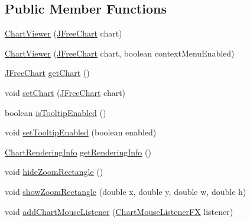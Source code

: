 \subsection*{Public Member Functions}
\begin{DoxyCompactItemize}
\item 
\mbox{\hyperlink{classorg_1_1jfree_1_1chart_1_1fx_1_1_chart_viewer_a4bccc9c8c5c2aafaae0150cbc6277b2d}{Chart\+Viewer}} (\mbox{\hyperlink{classorg_1_1jfree_1_1chart_1_1_j_free_chart}{J\+Free\+Chart}} chart)
\item 
\mbox{\hyperlink{classorg_1_1jfree_1_1chart_1_1fx_1_1_chart_viewer_a7c8707565c8c0eef578822e811200d25}{Chart\+Viewer}} (\mbox{\hyperlink{classorg_1_1jfree_1_1chart_1_1_j_free_chart}{J\+Free\+Chart}} chart, boolean context\+Menu\+Enabled)
\item 
\mbox{\hyperlink{classorg_1_1jfree_1_1chart_1_1_j_free_chart}{J\+Free\+Chart}} \mbox{\hyperlink{classorg_1_1jfree_1_1chart_1_1fx_1_1_chart_viewer_a1a140802ca5d675540bc2c71e39e2951}{get\+Chart}} ()
\item 
void \mbox{\hyperlink{classorg_1_1jfree_1_1chart_1_1fx_1_1_chart_viewer_ae4f3627a0cbf9f989301265d869c445f}{set\+Chart}} (\mbox{\hyperlink{classorg_1_1jfree_1_1chart_1_1_j_free_chart}{J\+Free\+Chart}} chart)
\item 
boolean \mbox{\hyperlink{classorg_1_1jfree_1_1chart_1_1fx_1_1_chart_viewer_a1f3902d6ad757313ffeede7d1d79b5f5}{is\+Tooltip\+Enabled}} ()
\item 
void \mbox{\hyperlink{classorg_1_1jfree_1_1chart_1_1fx_1_1_chart_viewer_a3824effec5e412cfb822ee248946e550}{set\+Tooltip\+Enabled}} (boolean enabled)
\item 
\mbox{\hyperlink{classorg_1_1jfree_1_1chart_1_1_chart_rendering_info}{Chart\+Rendering\+Info}} \mbox{\hyperlink{classorg_1_1jfree_1_1chart_1_1fx_1_1_chart_viewer_a0653c2a9d83917a2f4d948f45a54f005}{get\+Rendering\+Info}} ()
\item 
void \mbox{\hyperlink{classorg_1_1jfree_1_1chart_1_1fx_1_1_chart_viewer_a7509643571fd019c6b7a158cede6a7f6}{hide\+Zoom\+Rectangle}} ()
\item 
void \mbox{\hyperlink{classorg_1_1jfree_1_1chart_1_1fx_1_1_chart_viewer_a300e2e9eaa9eb944b9c4d3b84fbd9d33}{show\+Zoom\+Rectangle}} (double x, double y, double w, double h)
\item 
void \mbox{\hyperlink{classorg_1_1jfree_1_1chart_1_1fx_1_1_chart_viewer_a781fc0e11dd76743abfc0164be2e2732}{add\+Chart\+Mouse\+Listener}} (\mbox{\hyperlink{interfaceorg_1_1jfree_1_1chart_1_1fx_1_1interaction_1_1_chart_mouse_listener_f_x}{Chart\+Mouse\+Listener\+FX}} listener)

\end{DoxyCompactItemize}
